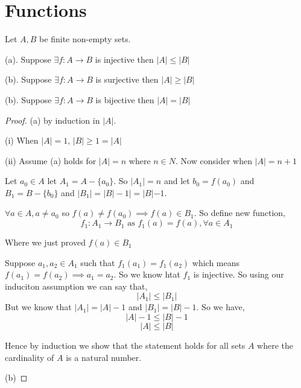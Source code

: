\chapter{Functions}

\begin{theorem}
   Let $A, B$ be finite non-empty sets. 

   (a). Suppose $\exists f: A \rightarrow B$ is injective then $|A| \le |B|$

   (b). Suppose $\exists f: A \rightarrow B$ is surjective then $|A| \ge |B|$

   (b). Suppose $\exists f: A \rightarrow B$ is bijective then $|A| = |B|$
\end{theorem}

\begin{proof}
    (a) by induction in $|A|$.

    (i) When $|A| = 1$,  $|B| \ge 1 = |A|$ 

    (ii) Assume (a) holds for  $|A| = n$ where $n \in N$. Now consider when  $|A| = n + 1$


    Let $a_0 \in A$ let $A_1 = A - \{a_0\}$. So $|A_1| = n$ and let $b_0 = f(a_0)$ and $B_1 = B - \{b_0\}$ and $|B_1| = |B| - 1| = |B| - 1$.

    $\forall a \in A, a \ne a_0$ so $f(a) \ne f(a_0) \implies f(a) \in B_1$. So define new function, 
    $$ f_1:A_1 \rightarrow B_1 \text{ as } f_1(a) = f(a), \forall a \in A_1 $$ 

    Where we just proved $f(a) \in B_1$

    Suppose $a_1,a_2 \in A_1$ such that $f_1(a_1) = f_1(a_2)$ which means $f(a_1) = f(a_2) \implies a_1 = a_2$. So we know htat $f_1$ is injective. So using our induciton assumption we can say that, 
    $$ |A_1| \le |B_1| $$  But we know that $|A_1| = |A| - 1$ and $|B_1| = |B| - 1$. So we have, 
    $$ |A| - 1 \le |B| - 1 $$ 
    $$ |A| \le |B| $$ 

    Hence by induction we show that the statement holds for all sets $A$ where the cardinality of $A$ is a natural number.

    \vspace{1em}
    (b)

\end{proof}


